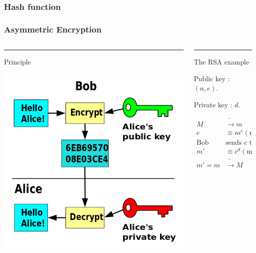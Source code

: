 \documentclass[12pt]{beamer}
\begin{document}
\begin{frame}
    \frametitle{Hash function}
\end{frame}

\begin{frame}
    \frametitle{Asymmetric Encryption}
    \begin{columns}[T]
        \begin{column}{.48\textwidth}
            {\color{blue}\rule{\linewidth}{4pt}

            Principle}
            \includegraphics[width=\linewidth]{public-key.png}
        \end{column}
        \hfill
        \begin{column}{.48\linewidth}
            {\color{green!40!black}\rule{\linewidth}{4pt}

            The RSA example}

            Public key : $(n,e)$.

            Private key : $d$.

            \begin{align*}
                M & \tilde{\longrightarrow} m \\
                c &\equiv m^e (\text{mod } n) \\
                \text{Bob } & \text{sends $c$ to Alice} \\
                m' &\equiv c^d (\text{mod } n) \\
                m' = m &\tilde{\longrightarrow} M\\
            \end{align*}
        \end{column}
    \end{columns}
\end{frame}
\end{document}

